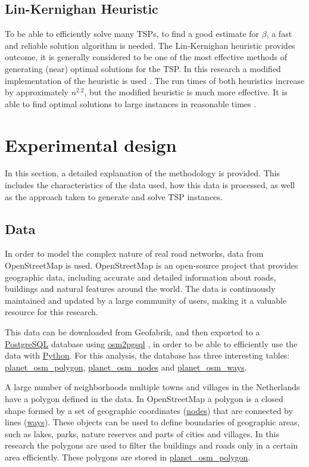 \documentclass[12pt]{article}
\numberwithin{equation}{section}
\newcommand{\1}[1]{\,I_{#1}} %
\begin{document}
\subsection{Lin-Kernighan Heuristic}
To be able to efficiently solve many TSPs, to find a good estimate for $\beta$, a fast and reliable
solution algorithm is needed. The Lin-Kernighan \citep{lin1973effective} heuristic provides outcome,
it is generally considered to be one of the most effective methods of generating (near) optimal
solutions for the TSP.
In this research a modified implementation of the heuristic is used \citep{helsgaun2000effective}.
The run times of both heuristics increase by approximately $n^{2.2}$, but the modified heuristic is
much more effective. It is able to find optimal solutions to large instances in reasonable times
\citep{helsgaun2000effective}.

\section{Experimental design}
In this section, a detailed explanation of the methodology is provided. This includes the 
characteristics of the data used, how this data is processed, as well as the approach taken to 
generate and solve TSP instances.
\subsection{Data}
In order to model the complex nature of real road networks, data from OpenStreetMap \citep{openstreetmap} is used. 
OpenStreetMap is an open-source project that provides geographic data, including accurate and 
detailed information about roads, buildings and natural features around the world. The data is 
continuously maintained and updated by a large community of users, making it a valuable resource 
for this research.

This data can be downloaded from Geofabrik, and then exported to a \url{PostgreSQL} database using
\url{osm2pgsql} \citep{osm2pgsql}, in order to be able to efficiently use the data with \url{Python}. 
For this analysis, the database has three interesting tables: 
\url{planet_osm_polygon}, \url{planet_osm_nodes} and \url{planet_osm_ways}.

A large number of neighborhoods multiple towns and villages in the Netherlands have a polygon 
defined in the data. In OpenStreetMap a polygon is a closed shape formed by a set of geographic coordinates 
(\url{nodes}) that are connected by lines (\url{ways}). These objects can be used to define boundaries of
geographic areas, such as lakes, parks, nature reserves and parts of cities and villages. In this
research the polygons are used to filter the buildings and roads only in a certain area efficiently.
These polygons are stored in \url{planet_osm_polygon}.
\end{document}
